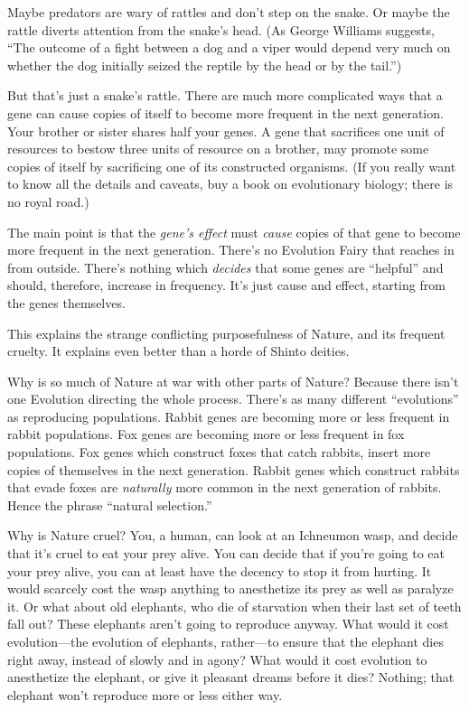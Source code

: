 {
 Maybe predators are wary of rattles and don't step
on the snake. Or maybe the rattle diverts attention from the
snake's head. (As George Williams suggests,
``The outcome of a fight between a dog and a viper
would depend very much on whether the dog initially seized the reptile
by the head or by the tail.'')}

{
 But that's just a snake's rattle.
There are much more complicated ways that a gene can cause copies of
itself to become more frequent in the next generation. Your brother or
sister shares half your genes. A gene that sacrifices one unit of
resources to bestow three units of resource on a brother, may promote
some copies of itself by sacrificing one of its constructed organisms.
(If you really want to know all the details and caveats, buy a book on
evolutionary biology; there is no royal road.)}

{
 The main point is that the \textit{gene's effect}
must \textit{cause} copies of that gene to become more frequent in the
next generation. There's no Evolution Fairy that
reaches in from outside. There's nothing which
\textit{decides} that some genes are
``helpful'' and should, therefore,
increase in frequency. It's just cause and effect,
starting from the genes themselves.}

{
 This explains the strange conflicting purposefulness of Nature,
and its frequent cruelty. It explains even better than a horde of
Shinto deities.}

{
 Why is so much of Nature at war with other parts of Nature?
Because there isn't one Evolution directing the whole
process. There's as many different
``evolutions'' as reproducing
populations. Rabbit genes are becoming more or less frequent in rabbit
populations. Fox genes are becoming more or less frequent in fox
populations. Fox genes which construct foxes that catch rabbits, insert
more copies of themselves in the next generation. Rabbit genes which
construct rabbits that evade foxes are \textit{naturally} more common
in the next generation of rabbits. Hence the phrase
``natural selection.''}

{
 Why is Nature cruel? You, a human, can look at an Ichneumon wasp,
and decide that it's cruel to eat your prey alive. You
can decide that if you're going to eat your prey alive,
you can at least have the decency to stop it from hurting. It would
scarcely cost the wasp anything to anesthetize its prey as well as
paralyze it. Or what about old elephants, who die of starvation when
their last set of teeth fall out? These elephants
aren't going to reproduce anyway. What would it cost
evolution---the evolution of elephants, rather---to ensure that the
elephant dies right away, instead of slowly and in agony? What would it
cost evolution to anesthetize the elephant, or give it pleasant dreams
before it dies? Nothing; that elephant won't reproduce
more or less either way.}

